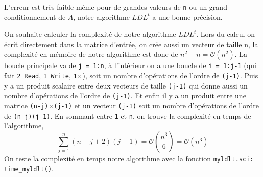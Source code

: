 \documentclass{article}
\begin{document}
L'erreur est très faible même pour de grandes valeurs de \texttt{n} ou un grand conditionnement de \(A\), notre algorithme \(LDL^t\) a une bonne précision.\newline\indent

On souhaite calculer la complexité de notre algorithme \(LDL^t\).\newline
Lors du calcul on écrit directement dans la matrice d'entrée, on crée aussi un vecteur de taille n, la complexité en mémoire de notre algorithme est donc de \(n^2+n = \mathcal{O}(n^2)\).\newline
La boucle principale va de \texttt{j = 1:n}, à l'intérieur on a une boucle de \texttt{i = 1:j-1} (qui fait \texttt{2 Read}, \texttt{1 Write}, \texttt{1}\(\times\)), soit un nombre d'opérations de l'ordre de \texttt{(j-1)}.\newline
Puis y a un produit scalaire entre deux vecteurs de taille \texttt{(j-1)} qui donne aussi un nombre d'opérations de l'ordre de \texttt{(j-1)}. \newline
Et enfin il y a un produit entre une matrice \texttt{(n-j)}\(\times\)\texttt{(j-1)} et un vecteur \texttt{(j-1)} soit un nombre d'opérations de l'ordre de \texttt{(n-j)(j-1)}.\newline
En sommant entre \texttt{1} et \texttt{n}, on trouve la complexité en temps de l'algorithme,
\[
\sum_{j=1}^n (n-j+2)(j-1) = \mathcal{O}(\frac{n^3}{6}) = \mathcal{O}(n^3)
\]
On teste la complexité en temps notre algorithme avec la fonction \texttt{myldlt.sci: time\_myldlt()}.
\end{document}
